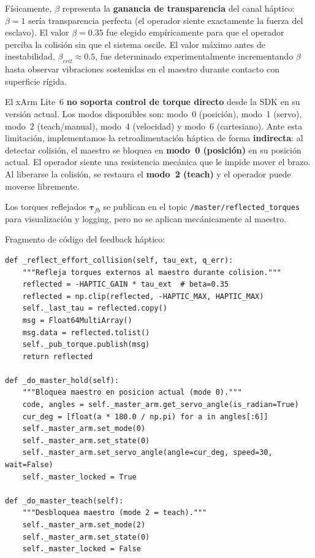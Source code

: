 \documentclass[journal,10pt,twoside]{IEEEtran}
\begin{document}
Físicamente, $\beta$ representa la \textbf{ganancia de transparencia}
del canal háptico: $\beta=1$ sería transparencia perfecta (el operador
siente exactamente la fuerza del esclavo). El valor $\beta=0{.}35$ fue
elegido empíricamente para que el operador perciba la colisión sin que
el sistema oscile. El valor máximo antes de inestabilidad,
$\beta_{crit}\approx0{.}5$, fue determinado experimentalmente
incrementando $\beta$ hasta observar vibraciones sostenidas en el
maestro durante contacto con superficie rígida.

El xArm Lite~6 \textbf{no soporta control de torque
directo} desde la SDK en su versión actual. Los modos disponibles son:
modo~0 (posición), modo~1 (servo), modo~2 (teach/manual), modo~4
(velocidad) y modo~6 (cartesiano). Ante esta limitación, implementamos
la retroalimentación háptica de forma \textbf{indirecta}: al detectar
colisión, el maestro se bloquea en \textbf{modo~0 (posición)} en su
posición actual. El operador siente una resistencia mecánica que le
impide mover el brazo. Al liberarse la colisión, se restaura el
\textbf{modo~2 (teach)} y el operador puede moverse libremente.

Los torques reflejados $\bm{\tau}_{fb}$ se publican en el topic
\texttt{/master/reflected\_torques} para visualización y logging,
pero no se aplican mecánicamente al maestro.

Fragmento de código del feedback háptico:

\begin{lstlisting}[caption={Feedback háptico en el maestro},
                   label={lst:haptic}]
def _reflect_effort_collision(self, tau_ext, q_err):
    """Refleja torques externos al maestro durante colision."""
    reflected = -HAPTIC_GAIN * tau_ext  # beta=0.35
    reflected = np.clip(reflected, -HAPTIC_MAX, HAPTIC_MAX)
    self._last_tau = reflected.copy()
    msg = Float64MultiArray()
    msg.data = reflected.tolist()
    self._pub_torque.publish(msg)
    return reflected

def _do_master_hold(self):
    """Bloquea maestro en posicion actual (mode 0)."""
    code, angles = self._master_arm.get_servo_angle(is_radian=True)
    cur_deg = [float(a * 180.0 / np.pi) for a in angles[:6]]
    self._master_arm.set_mode(0)
    self._master_arm.set_state(0)
    self._master_arm.set_servo_angle(angle=cur_deg, speed=30, wait=False)
    self._master_locked = True

def _do_master_teach(self):
    """Desbloquea maestro (mode 2 = teach)."""
    self._master_arm.set_mode(2)
    self._master_arm.set_state(0)
    self._master_locked = False
\end{lstlisting}
\end{document}
